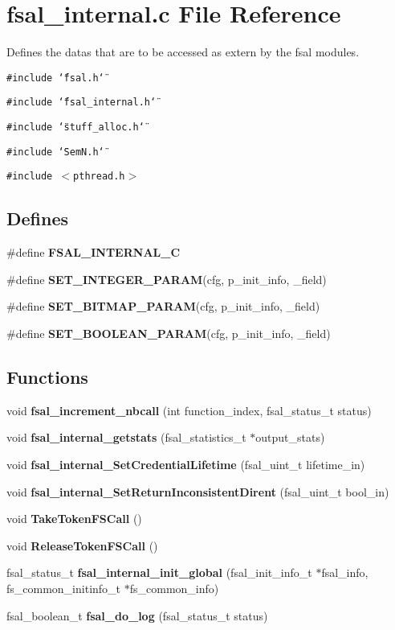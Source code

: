 \section{fsal\_\-internal.c File Reference}
\label{fsal__internal_8c}
Defines the datas that are to be accessed as extern by the fsal modules.  


{\tt \#include \char`\"{}fsal.h\char`\"{}}\par
{\tt \#include \char`\"{}fsal\_\-internal.h\char`\"{}}\par
{\tt \#include \char`\"{}stuff\_\-alloc.h\char`\"{}}\par
{\tt \#include \char`\"{}SemN.h\char`\"{}}\par
{\tt \#include $<$pthread.h$>$}\par
\subsection*{Defines}
\begin{CompactItemize}
\item 
\#define \textbf{FSAL\_\-INTERNAL\_\-C}\label{fsal__internal_8c_cfa63689895f5e17e205bd65f0178c0d}

\item 
\#define \textbf{SET\_\-INTEGER\_\-PARAM}(cfg, p\_\-init\_\-info, \_\-field)
\item 
\#define \textbf{SET\_\-BITMAP\_\-PARAM}(cfg, p\_\-init\_\-info, \_\-field)
\item 
\#define \textbf{SET\_\-BOOLEAN\_\-PARAM}(cfg, p\_\-init\_\-info, \_\-field)
\end{CompactItemize}
\subsection*{Functions}
\begin{CompactItemize}
\item 
void {\bf fsal\_\-increment\_\-nbcall} (int function\_\-index, fsal\_\-status\_\-t status)
\item 
void {\bf fsal\_\-internal\_\-getstats} (fsal\_\-statistics\_\-t $\ast$output\_\-stats)
\item 
void {\bf fsal\_\-internal\_\-SetCredentialLifetime} (fsal\_\-uint\_\-t lifetime\_\-in)
\item 
void {\bf fsal\_\-internal\_\-SetReturnInconsistentDirent} (fsal\_\-uint\_\-t bool\_\-in)
\item 
void {\bf TakeTokenFSCall} ()
\item 
void \textbf{ReleaseTokenFSCall} ()\label{fsal__internal_8c_3ebf10f203cc6b718170d47f661b101a}

\item 
fsal\_\-status\_\-t \textbf{fsal\_\-internal\_\-init\_\-global} (fsal\_\-init\_\-info\_\-t $\ast$fsal\_\-info, fs\_\-common\_\-initinfo\_\-t $\ast$fs\_\-common\_\-info)\label{fsal__internal_8c_806e3a89735ee912440d4b6e60a20dae}

\item 
fsal\_\-boolean\_\-t {\bf fsal\_\-do\_\-log} (fsal\_\-status\_\-t status)
\end{CompactItemize}
